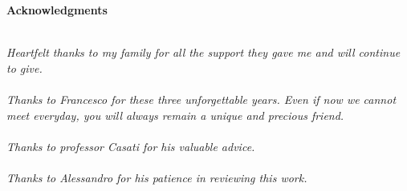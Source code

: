 \thispagestyle{empty}

\begin{center}
  {\bf \Huge Acknowledgments}
\end{center}

\vspace{4cm}


\emph{\\
  Heartfelt thanks to my family for all the support they gave me and will continue to give.\\ \\
  Thanks to Francesco for these three unforgettable years. Even if now we cannot meet everyday, you will always remain a unique and precious friend.\\ \\
  Thanks to professor Casati for his valuable advice.\\ \\
  Thanks to Alessandro for his patience in reviewing this work.\\
}
